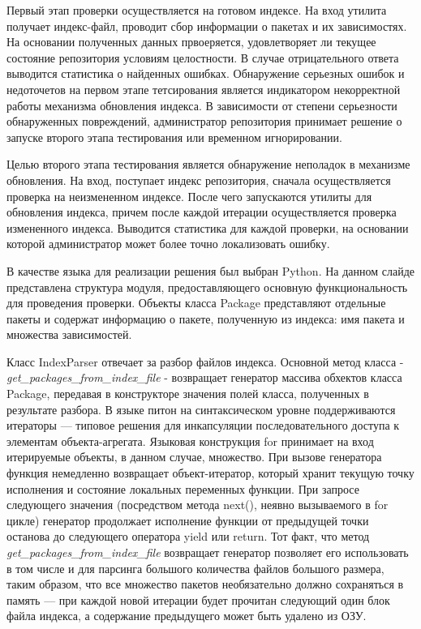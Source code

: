\documentclass[a4paper]{article}
\begin{document}
Первый этап проверки осуществляется на готовом индексе. На вход утилита 
получает индекс-файл, проводит сбор информации о пакетах и их зависимостях. 
На основании полученных данных првоеряется, удовлетворяет ли текущее состояние 
репозитория условиям целостности. В случае отрицательного ответа выводится 
статистика о найденных ошибках. Обнаружение серьезных ошибок и недоточетов 
на первом этапе тетсирования является индикатором некорректной работы 
механизма обновления индекса. В зависимости от степени серьезности обнаруженных
повреждений, администратор репозитория принимает решение о запуске второго этапа 
тестирования или временном игнорировании.

Целью второго этапа тестирования является обнаружение неполадок в механизме 
обновления. На вход, поступает индекс репозитория, сначала осуществляется 
проверка на неизмененном индексе. После чего запускаются
утилиты для обновления индекса, причем после каждой итерации осуществляется 
проверка измененного индекса. Выводится статистика для каждой проверки, 
на основании которой администратор может более точно локализовать ошибку.

В качестве языка для реализации решения был выбран Python. На данном слайде 
представлена структура модуля, предоставляющего основную функциональность 
для проведения проверки. Объекты класса Package представляют отдельные пакеты 
и содержат информацию о пакете, полученную из индекса: имя пакета и множества 
зависимостей.

Класс IndexParser отвечает за разбор файлов индекса. Основной метод класса 
- \textit{get\_packages\_from\_index\_file} - возвращает генератор массива 
обхектов класса Package, передавая в конструкторе значения полей класса, 
полученных в результате разбора. В языке питон на синтаксическом уровне 
поддерживаются итераторы --- типовое решения для инкапсуляции последовательного 
доступа к элементам объекта-агрегата. Языковая конструкция for принимает на вход 
итерируемые объекты, в данном случае, множество. При вызове генератора функция 
немедленно возвращает объект-итератор, который хранит текущую точку исполнения 
и состояние локальных переменных функции. При запросе следующего значения 
(посредством метода next(), неявно вызываемого в for цикле) генератор продолжает 
исполнение функции от предыдущей точки останова до следующего оператора yield или return.
Тот факт, что метод \textit{get\_packages\_from\_index\_file} возвращает генератор позволяет
его использовать в том числе и для парсинга большого количества файлов большого размера, 
таким образом, что все множество пакетов необязательно должно сохраняться в память ---
при каждой новой итерации будет прочитан следующий один блок файла индекса, 
а содержание предыдущего может быть удалено из ОЗУ.
\end{document}
